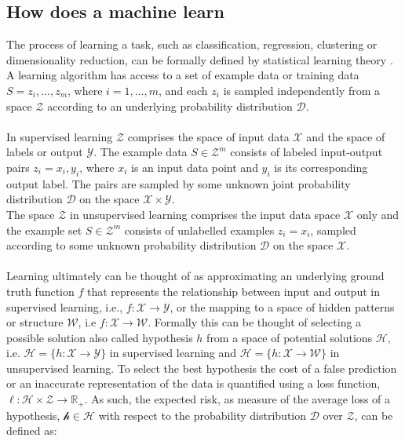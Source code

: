 \subsection{How does a machine learn}
The process of learning a task, such as classification, regression, clustering or dimensionality reduction, can be formally defined by statistical learning theory \cite{Von_luxburg2011,Shalev2014}. A learning algorithm has access to a set of example data or training data $S={z_i,...,z_m}$, where $i = 1,\dots,m$, and each $z_i$ is sampled independently from a space $\mathcal{Z}$ according to an underlying probability distribution $\mathcal{D}$.\\
\\
In supervised learning $\mathcal{Z}$ comprises the space of input data $\mathcal{X}$ and the space of labels or output $\mathcal{Y}$. The example data $S\in\mathcal{Z}^m$ consists of labeled input-output pairs $z_i=x_i,y_i$, where $x_i$ is an input data point and $y_i$ is its corresponding output label. The pairs are sampled by some unknown joint probability distribution $\mathcal{D}$ on the space $\mathcal{X}\times\mathcal{Y}$.\\
The space $\mathcal{Z}$ in unsupervised learning comprises the input data space $\mathcal{X}$ only and the example set $S\in\mathcal{Z}^m$ consists of unlabelled examples $z_i=x_i$, sampled according to some unknown probability distribution $\mathcal{D}$ on the space $\mathcal{X}$.\\
\\
Learning ultimately can be thought of as approximating an underlying ground truth function $f$ that represents the relationship between input and output in supervised learning, i.e., $f:\mathcal{X}\rightarrow\mathcal{Y}$, or the mapping to a space of hidden patterns or structure $\mathcal{W}$, i.e $f:\mathcal{X}\rightarrow\mathcal{W}$. Formally this can be thought of selecting a possible solution also called hypothesis $h$ from a space of potential solutions $\mathcal{H}$, i.e. $\mathcal{H}=\{h:\mathcal{X}\rightarrow\mathcal{Y}\}$ in supervised learning and $\mathcal{H}=\{h:\mathcal{X}\rightarrow\mathcal{W}\}$ in unsupervised learning. To select the best hypothesis the cost of a false prediction or an inaccurate representation of the data is quantified using a loss function, $\ell:\mathcal{H}\times\mathcal{Z}\rightarrow\mathbb{R}_+$.  As such, the expected risk, as measure of the average loss of a hypothesis, $\mathcal{h}\in\mathcal{H}$ with respect to the probability distribution $\mathcal{D}$ over $\mathcal{Z}$,  can be defined as:
